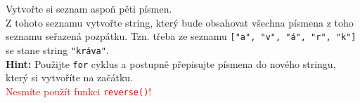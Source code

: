 \question[50]
Vytvořte si seznam aspoň pěti písmen.\\
Z tohoto seznamu vytvořte string, který bude obsahovat všechna písmena z toho
seznamu seřazená pozpátku. Tzn. třeba ze seznamu \texttt{["a", "v", "á", "r",
			"k"]} se stane string \texttt{"kráva"}.\\
\textbf{Hint:} Použijte \texttt{for} cyklus a postupně přepisujte písmena do
nového stringu, který si vytvoříte na začátku.\\
\textcolor{red}{Nesmíte použít funkci \texttt{reverse()}!}